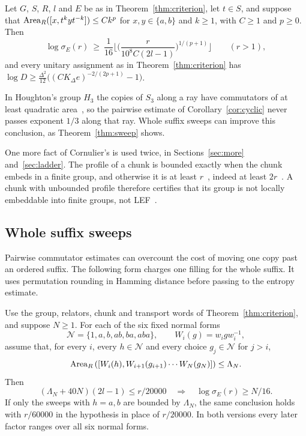 \begin{corollary}\label{cor:cyclic}
Let $G$, $S$, $R$, $l$ and $E$ be as in Theorem~\ref{thm:criterion}, let $t\in S$, and suppose that
$\operatorname{Area}_R([x,t^kyt^{-k}])\le Ck^p$ for $x,y\in\{a,b\}$ and $k\ge1$, with $C\ge1$ and $p\ge0$. Then
\[
\log\sigma_E(r)\ \ge\ \frac1{16}\Big\lfloor\Big(\frac r{10^8C(2l-1)}\Big)^{1/(p+1)}\Big\rfloor\qquad(r>1),
\]
and every unitary assignment as in Theorem~\ref{thm:criterion} has $\log D\ge\frac{\Delta^2}{12}\bigl((CK_\Delta e)^{-2/(2p+1)}-1\bigr)$.
\end{corollary}

In Houghton's group $H_3$ the copies of $S_3$ along a ray have commutators of at least quadratic area~\cite[Proposition~3.4]{DouglasMghirbiA},
so the pairwise estimate of Corollary~\ref{cor:cyclic} never passes exponent $1/3$ along that ray. Whole suffix sweeps can improve this conclusion, as Theorem~\ref{thm:sweep} shows.

One more fact of Cornulier's is used twice, in Sections~\ref{sec:more} and~\ref{sec:ladder}. The profile of a chunk is bounded exactly when the
chunk embeds in a finite group, and otherwise it is at least $r$~\cite[Fact~3.5]{Cornulier2013}, indeed at least
$2r$~\cite[Lemma~2.1]{DouglasMghirbiA}. A chunk with unbounded profile therefore certifies that its group is not locally embeddable into finite
groups, not LEF~\cite[Fact~3.8]{Cornulier2013}.

\subsection{Whole suffix sweeps}

Pairwise commutator estimates can overcount the cost of moving one copy past an ordered suffix. The following form charges one filling
for the whole suffix. It uses permutation rounding in Hamming distance before passing to the entropy estimate.

\begin{theorem}\label{thm:sweep}
Use the group, relators, chunk and transport words of Theorem~\ref{thm:criterion}, and suppose $N\ge1$.
For each of the six fixed normal forms
\[
\mathcal N=\{1,a,b,ab,ba,aba\},\qquad W_i(g)=w_i g w_i^{-1},
\]
assume that, for every $i$, every $h\in\mathcal N$ and every choice $g_j\in\mathcal N$ for $j>i$,
\[
\operatorname{Area}_R\left([W_i(h),W_{i+1}(g_{i+1})\cdots W_N(g_N)]\right)\le\Lambda_N.
\]
Then
\begin{equation}\label{eq:sweep-criterion}
 (\Lambda_N+40N)(2l-1)\le r/20000
 \quad\Longrightarrow\quad \log\sigma_E(r)\ge N/16.
\end{equation}
If only the sweeps with $h=a,b$ are bounded by $\Lambda_N$, the same conclusion holds with $r/60000$ in the
hypothesis in place of $r/20000$. In both versions every later factor ranges over all six normal forms.
\end{theorem}

